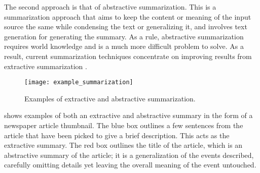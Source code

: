 

The second approach is that of abstractive summarization. This is a summarization approach that aims to keep the content or meaning of the input source the same while condensing the text or generalizing it, and involves text generation for generating the summary. As a rule, abstractive summarization requires world knowledge and is a much more difficult problem to solve. As a result, current summarization techniques concentrate on improving results from extractive summarization \citep{nenkova2012survey}. 

\begin{figure}[!t]
\centering
\texttt{[image: example\_summarization]}
\caption{Examples of extractive and abstractive summarization.}
\label{fig:examples}
\end{figure}

 shows examples of both an extractive and abstractive summary in the form of a newspaper article thumbnail. The blue box outlines a few sentences from the article that have been picked to give a brief description. This acts as the extractive summary. The red box outlines the title of the article, which is an abstractive summary of the article; it is a generalization of the events described, carefully omitting details yet leaving the overall meaning of the event untouched.





